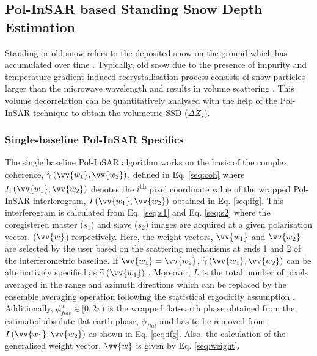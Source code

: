 \documentclass[review]{elsarticle}
\numberwithin{equation}{section}
\numberwithin{figure}{section}
\numberwithin{table}{section}
\begin{document}
\subsection{Pol-InSAR based Standing Snow Depth Estimation}
\label{ssec:ssd}

Standing or old snow refers to the deposited snow on the ground which has accumulated over time \citep{Reynolds1983}. Typically, old snow due to the presence of impurity and temperature-gradient induced recrystallisation process consists of snow particles larger than the microwave wavelength and results in volume scattering \citep{Leinss2016, Riche2013}. This volume decorrelation can be quantitatively analysed with the help of the Pol-InSAR technique \citep{Cloude2010} to obtain the volumetric SSD ($\Delta{Z_s}$). 

\subsubsection{Single-baseline Pol-InSAR Specifics}

The single baseline Pol-InSAR algorithm works on the basis of the complex coherence, $\widetilde{\gamma}\left(\vv{w_1}, \vv{w_2}\right)$, defined in Eq. \eqref{seq:coh} where $I_i\left(\vv{w_1}, \vv{w_2}\right)$ denotes the $i$\textsuperscript{th} pixel coordinate value of the wrapped Pol-InSAR interferogram, $I\left(\vv{w_1}, \vv{w_2}\right)$ obtained in Eq. \eqref{seq:ifg}. This interferogram is calculated from Eq. \eqref{seq:s1} and Eq. \eqref{seq:s2} where the coregistered master ($s_1$) and slave ($s_2$) images are acquired at a given polarisation vector, ($\vv{w}$) respectively. Here, the weight vectors, $\vv{w_1}$ and $\vv{w_2}$ are selected by the user based on the scattering mechanisms at ends 1 and 2 of the interferometric baseline. If $\vv{w_1} = \vv{w_2}$, $\widetilde{\gamma}\left(\vv{w_1}, \vv{w_2}\right)$ can be alternatively specified as $\widetilde{\gamma}\left(\vv{w_1}\right)$ \citep{Cloude2005, Cloude2010}. Moreover, $L$ is the total number of pixels averaged in the range and azimuth directions which can be replaced by the ensemble averaging operation following the statistical ergodicity assumption \citep{Hanssen2001, Hoen2000, Kugler2015, Kumar2017, Papathanassiou2001}. Additionally, $\phi_{flat}^w \in [0, 2\pi)$ is the wrapped flat-earth phase obtained from the estimated absolute flat-earth phase, $\phi_{flat}$ and has to be removed from $I\left(\vv{w_1}, \vv{w_2}\right)$ as shown in Eq. \eqref{seq:ifg}. Also, the calculation of the generalised weight vector, $\vv{w}$ is given by Eq. \eqref{seq:weight}.
\end{document}
